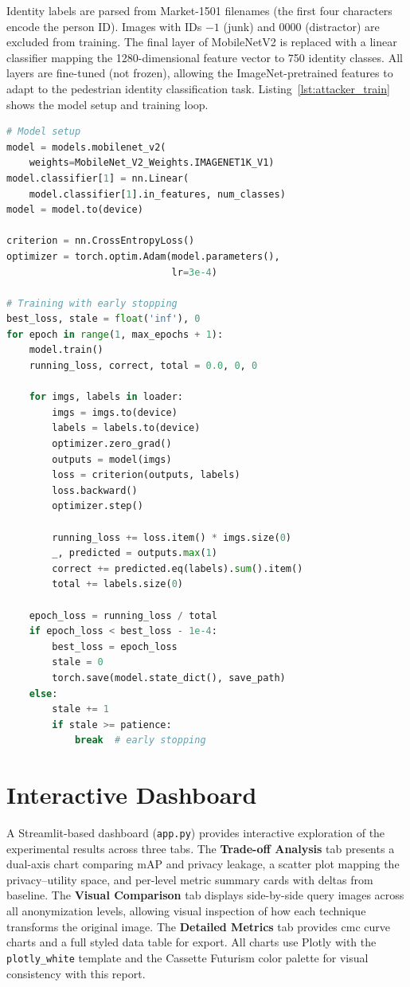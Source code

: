 Identity labels are parsed from Market-1501 filenames (the first four characters encode the person ID). Images with IDs $-1$ (junk) and $0000$ (distractor) are excluded from training. The final layer of MobileNetV2 is replaced with a linear classifier mapping the 1280-dimensional feature vector to 750 identity classes. All layers are fine-tuned (not frozen), allowing the ImageNet-pretrained features to adapt to the pedestrian identity classification task. Listing~\ref{lst:attacker_train} shows the model setup and training loop.

\begin{lstlisting}[language=Python, caption={Attacker model training loop (\texttt{train\_attacker.py}).}, label=lst:attacker_train]
# Model setup
model = models.mobilenet_v2(
    weights=MobileNet_V2_Weights.IMAGENET1K_V1)
model.classifier[1] = nn.Linear(
    model.classifier[1].in_features, num_classes)
model = model.to(device)

criterion = nn.CrossEntropyLoss()
optimizer = torch.optim.Adam(model.parameters(),
                             lr=3e-4)

# Training with early stopping
best_loss, stale = float('inf'), 0
for epoch in range(1, max_epochs + 1):
    model.train()
    running_loss, correct, total = 0.0, 0, 0

    for imgs, labels in loader:
        imgs = imgs.to(device)
        labels = labels.to(device)
        optimizer.zero_grad()
        outputs = model(imgs)
        loss = criterion(outputs, labels)
        loss.backward()
        optimizer.step()

        running_loss += loss.item() * imgs.size(0)
        _, predicted = outputs.max(1)
        correct += predicted.eq(labels).sum().item()
        total += labels.size(0)

    epoch_loss = running_loss / total
    if epoch_loss < best_loss - 1e-4:
        best_loss = epoch_loss
        stale = 0
        torch.save(model.state_dict(), save_path)
    else:
        stale += 1
        if stale >= patience:
            break  # early stopping
\end{lstlisting}


\section{Interactive Dashboard}

A Streamlit-based dashboard (\texttt{app.py}) provides interactive exploration of the experimental results across three tabs. The \textbf{Trade-off Analysis} tab presents a dual-axis chart comparing mAP and privacy leakage, a scatter plot mapping the privacy--utility space, and per-level metric summary cards with deltas from baseline. The \textbf{Visual Comparison} tab displays side-by-side query images across all anonymization levels, allowing visual inspection of how each technique transforms the original image. The \textbf{Detailed Metrics} tab provides \acrshort{cmc} curve charts and a full styled data table for export. All charts use Plotly with the \texttt{plotly\_white} template and the Cassette Futurism color palette for visual consistency with this report.
